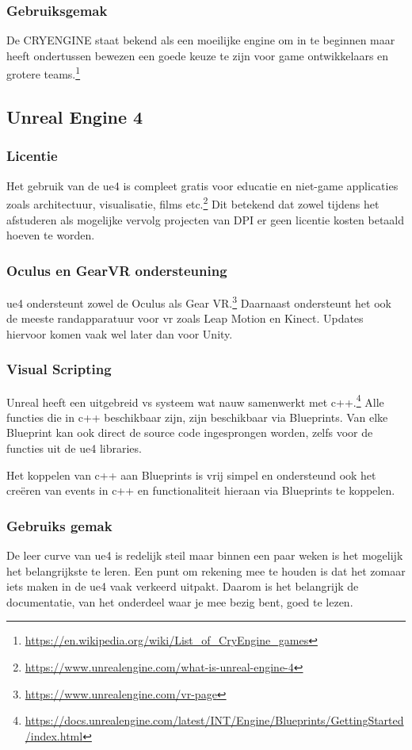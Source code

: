 \subsubsection{Gebruiksgemak}
De CRYENGINE staat bekend als een moeilijke engine om in te beginnen maar heeft ondertussen bewezen een goede keuze te zijn voor game ontwikkelaars en grotere teams.\footnote{\url{https://en.wikipedia.org/wiki/List_of_CryEngine_games}}

\subsection{Unreal Engine 4}
\subsubsection{Licentie}
Het gebruik van de \gls{ue4} is compleet gratis voor educatie en niet-game applicaties zoals architectuur, visualisatie, films etc.\footnote{\url{https://www.unrealengine.com/what-is-unreal-engine-4}} Dit betekend dat zowel tijdens het afstuderen als mogelijke vervolg projecten van DPI er geen licentie kosten betaald hoeven te worden.

\subsubsection{Oculus en GearVR ondersteuning}
\gls{ue4} ondersteunt zowel de Oculus als Gear VR.\footnote{\url{https://www.unrealengine.com/vr-page}} Daarnaast ondersteunt het ook de meeste randapparatuur voor \gls{vr} zoals Leap Motion en Kinect. Updates hiervoor komen vaak wel later dan voor Unity.

\subsubsection{Visual Scripting}
Unreal heeft een uitgebreid \gls{vs} systeem wat nauw samenwerkt met c++.\footnote{\url{https://docs.unrealengine.com/latest/INT/Engine/Blueprints/GettingStarted/index.html}} Alle functies die in c++ beschikbaar zijn, zijn beschikbaar via Blueprints. Van elke Blueprint kan ook direct de source code ingesprongen worden, zelfs voor de functies uit de \gls{ue4} libraries.

Het koppelen van c++ aan Blueprints is vrij simpel en ondersteund ook het creëren van events in c++ en functionaliteit hieraan via Blueprints te koppelen.

\subsubsection{Gebruiks gemak}
De leer curve van \gls{ue4} is redelijk steil maar binnen een paar weken is het mogelijk het belangrijkste te leren. Een punt om rekening mee te houden is dat het zomaar iets maken in de \gls{ue4} vaak verkeerd uitpakt. Daarom is het belangrijk de documentatie, van het onderdeel waar je mee bezig bent, goed te lezen.

